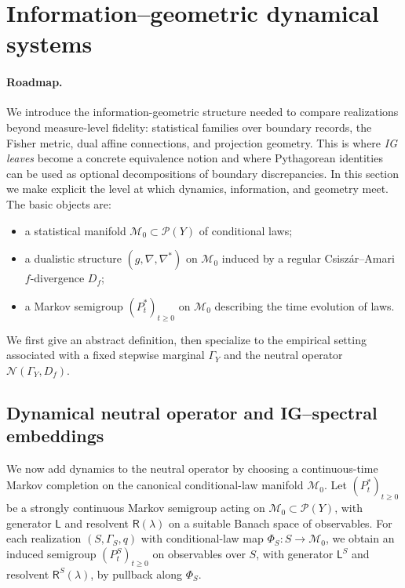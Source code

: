 \documentclass[11pt]{article}
\newcommand{\Pcal}{\mathcal{P}}
\newcommand{\Mcal}{\mathcal{M}}
\newcommand{\Ncal}{\mathcal{N}}
\newcommand{\Lsf}{\mathsf{L}}
\newcommand{\Rsf}{\mathsf{R}}
\begin{document}
\section{Information--geometric dynamical systems}
\label{sec:ig-dynamical-systems}


\paragraph{Roadmap.}
We introduce the information-geometric structure needed to compare realizations beyond measure-level fidelity: statistical families over boundary records, the Fisher metric, dual affine connections, and projection geometry.
This is where \emph{IG leaves} become a concrete equivalence notion and where Pythagorean identities can be used as optional decompositions of boundary discrepancies.
\medskip
In this section we make explicit the level at which dynamics, information, and
geometry meet. The basic objects are:
\begin{itemize}[leftmargin=1.5em]
  \item a statistical manifold $\Mcal_0 \subset \Pcal(Y)$ of conditional laws;
  \item a dualistic structure $(g,\nabla,\nabla^\ast)$ on $\Mcal_0$ induced by a
  regular Csiszár--Amari $f$-divergence $D_f$;
  \item a Markov semigroup $(P_t^\ast)_{t\ge 0}$ on $\Mcal_0$ describing the
  time evolution of laws.
\end{itemize}
We first give an abstract definition, then specialize to the empirical setting
associated with a fixed stepwise marginal $\Gamma_Y$ and the neutral operator
$\Ncal(\Gamma_Y,D_f)$.


\subsection{Dynamical neutral operator and IG--spectral embeddings}
\label{subsec:dyn-neutral-operator-ig-spectral}

We now add dynamics to the neutral operator by choosing a continuous-time
Markov completion on the canonical conditional-law manifold $\Mcal_0$.
Let $(P_t^\ast)_{t\ge 0}$ be a strongly continuous Markov semigroup
acting on $\Mcal_0\subset \Pcal(Y)$, with generator $\Lsf$ and resolvent
$\Rsf(\lambda)$ on a suitable Banach space of observables. For each
realization $(S,\Gamma_S,q)$ with conditional-law map
$\Phi_S:S\to\Mcal_0$, we obtain an induced semigroup
$(P_t^{S})_{t\ge 0}$ on observables over $S$, with generator $\Lsf^S$
and resolvent $\Rsf^S(\lambda)$, by pullback along $\Phi_S$.
\end{document}
